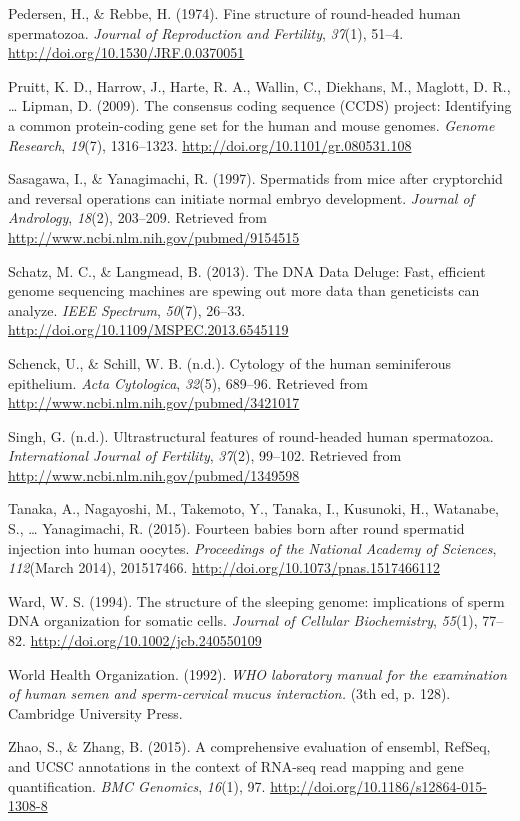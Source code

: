 \documentclass[12pt,twoside]{reedthesis}
\theoremstyle{definition}
\theoremstyle{definition}
\theoremstyle{remark}
\begin{document}
  \hypertarget{ref-Pedersen1974}{}
  Pedersen, H., \& Rebbe, H. (1974). Fine structure of round-headed human
  spermatozoa. \emph{Journal of Reproduction and Fertility}, \emph{37}(1),
  51--4. \url{http://doi.org/10.1530/JRF.0.0370051}
  
  \hypertarget{ref-Pruitt2009}{}
  Pruitt, K. D., Harrow, J., Harte, R. A., Wallin, C., Diekhans, M.,
  Maglott, D. R., \ldots{} Lipman, D. (2009). The consensus coding
  sequence (CCDS) project: Identifying a common protein-coding gene set
  for the human and mouse genomes. \emph{Genome Research}, \emph{19}(7),
  1316--1323. \url{http://doi.org/10.1101/gr.080531.108}
  
  \hypertarget{ref-Sasagawa}{}
  Sasagawa, I., \& Yanagimachi, R. (1997). Spermatids from mice after
  cryptorchid and reversal operations can initiate normal embryo
  development. \emph{Journal of Andrology}, \emph{18}(2), 203--209.
  Retrieved from \url{http://www.ncbi.nlm.nih.gov/pubmed/9154515}
  
  \hypertarget{ref-Schatz2013}{}
  Schatz, M. C., \& Langmead, B. (2013). The DNA Data Deluge: Fast,
  efficient genome sequencing machines are spewing out more data than
  geneticists can analyze. \emph{IEEE Spectrum}, \emph{50}(7), 26--33.
  \url{http://doi.org/10.1109/MSPEC.2013.6545119}
  
  \hypertarget{ref-Schenck}{}
  Schenck, U., \& Schill, W. B. (n.d.). Cytology of the human seminiferous
  epithelium. \emph{Acta Cytologica}, \emph{32}(5), 689--96. Retrieved
  from \url{http://www.ncbi.nlm.nih.gov/pubmed/3421017}
  
  \hypertarget{ref-Singh}{}
  Singh, G. (n.d.). Ultrastructural features of round-headed human
  spermatozoa. \emph{International Journal of Fertility}, \emph{37}(2),
  99--102. Retrieved from \url{http://www.ncbi.nlm.nih.gov/pubmed/1349598}
  
  \hypertarget{ref-Tanaka2015}{}
  Tanaka, A., Nagayoshi, M., Takemoto, Y., Tanaka, I., Kusunoki, H.,
  Watanabe, S., \ldots{} Yanagimachi, R. (2015). Fourteen babies born
  after round spermatid injection into human oocytes. \emph{Proceedings of
  the National Academy of Sciences}, \emph{112}(March 2014), 201517466.
  \url{http://doi.org/10.1073/pnas.1517466112}
  
  \hypertarget{ref-Ward1994}{}
  Ward, W. S. (1994). The structure of the sleeping genome: implications
  of sperm DNA organization for somatic cells. \emph{Journal of Cellular
  Biochemistry}, \emph{55}(1), 77--82.
  \url{http://doi.org/10.1002/jcb.240550109}
  
  \hypertarget{ref-WorldHealthOrganization1992}{}
  World Health Organization. (1992). \emph{WHO laboratory manual for the
  examination of human semen and sperm-cervical mucus interaction.} (3th
  ed, p. 128). Cambridge University Press.
  
  \hypertarget{ref-Zhao2015}{}
  Zhao, S., \& Zhang, B. (2015). A comprehensive evaluation of ensembl,
  RefSeq, and UCSC annotations in the context of RNA-seq read mapping and
  gene quantification. \emph{BMC Genomics}, \emph{16}(1), 97.
  \url{http://doi.org/10.1186/s12864-015-1308-8}


\end{document}
